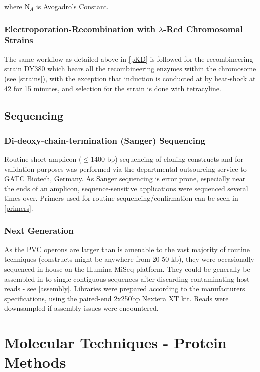 \noindent where $\mathrm{N}_{A}$ is Avogadro's Constant.

\subsubsection{Electroporation-Recombination with $\lambda$-Red Chromosomal Strains}
The same workflow as detailed above in \vref{pKD} is followed for the recombineering strain DY380 which bears all the recombineering enzymes within the chromosome (see \vref{strains}), with the exception that induction is conducted at \OD{} by heat-shock at 42\degC{} for 15 minutes, and selection for the strain is done with tetracyline. 

\subsection{Sequencing}
	\subsubsection{Di-deoxy-chain-termination (Sanger) Sequencing}\label{Sanger}
	Routine short amplicon ($\leq$1400 bp) sequencing of cloning constructs and for validation purposes was performed via the departmental outsourcing service to GATC Biotech, Germany. As Sanger sequencing is error prone, especially near the ends of an amplicon, sequence-sensitive applications were sequenced several times over.
	Primers used for routine sequencing/confirmation can be seen in \vref{primers}.
	
	\subsubsection{Next Generation}
	As the PVC operons are larger than is amenable to the vast majority of routine techniques (constructs might be anywhere from 20-50 kb), they were occasionally sequenced in-house on the Illumina MiSeq platform. They could be generally be assembled in to single contiguous sequences after discarding contaminating host reads - see \vref{assembly}. Libraries were prepared according to the manufacturers specifications, using the paired-end 2x250bp Nextera XT kit. Reads were downsampled if assembly issues were encountered.




\section{Molecular Techniques - Protein Methods}
